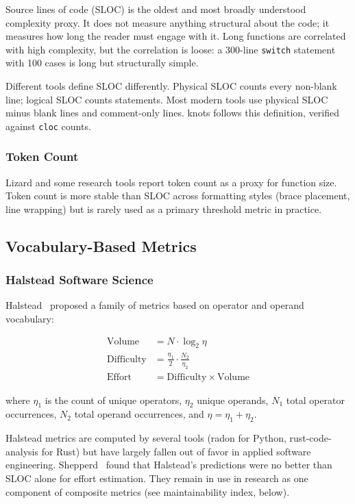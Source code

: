 \documentclass[10pt,twocolumn,letterpaper]{article}
\begin{document}
Source lines of code (SLOC) is the oldest and most broadly understood
complexity proxy.  It does not measure anything structural about the
code; it measures how long the reader must engage with it.  Long
functions are correlated with high complexity, but the correlation is
loose: a 300-line \texttt{switch} statement with 100 cases is long but
structurally simple.

Different tools define SLOC differently.  Physical SLOC counts every
non-blank line; logical SLOC counts statements.  Most modern tools use
physical SLOC minus blank lines and comment-only lines.  knots follows
this definition, verified against \texttt{cloc} counts.

\subsubsection{Token Count}

Lizard and some research tools report token count as a proxy for function
size.  Token count is more stable than SLOC across formatting styles
(brace placement, line wrapping) but is rarely used as a primary threshold
metric in practice.

\subsection{Vocabulary-Based Metrics}

\subsubsection{Halstead Software Science}

Halstead~\cite{halstead} proposed a family of metrics based on operator and
operand vocabulary:

\begin{align}
\text{Volume} &= N \cdot \log_2 \eta \\
\text{Difficulty} &= \frac{\eta_1}{2} \cdot \frac{N_2}{\eta_2} \\
\text{Effort} &= \text{Difficulty} \times \text{Volume}
\end{align}

where $\eta_1$ is the count of unique operators, $\eta_2$ unique operands,
$N_1$ total operator occurrences, $N_2$ total operand occurrences, and
$\eta = \eta_1 + \eta_2$.

Halstead metrics are computed by several tools (radon for Python,
rust-code-analysis for Rust) but have largely fallen out of favor in
applied software engineering.  Shepperd~\cite{shepperd} found that
Halstead's predictions were no better than SLOC alone for effort
estimation.  They remain in use in research as one component of composite
metrics (see maintainability index, below).
\end{document}
